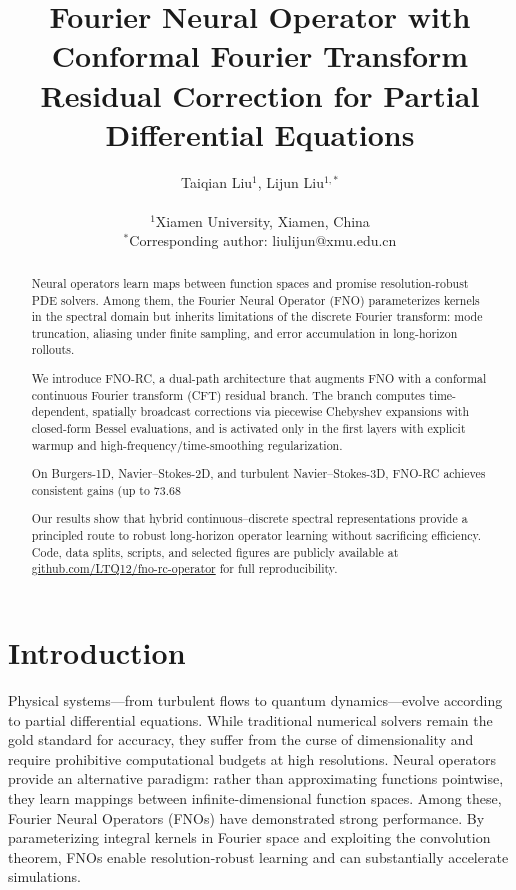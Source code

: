 \documentclass[11pt]{article}
\title{\textbf{Fourier Neural Operator with Conformal Fourier Transform Residual Correction for Partial Differential Equations}}
\author{
    Taiqian Liu$^{1}$, Lijun Liu$^{1,*}$ \\
    \\
    $^{1}$Xiamen University, Xiamen, China \\
    $^{*}$Corresponding author: liulijun@xmu.edu.cn
}
\date{}
\begin{document}
\maketitle

\begin{abstract}
Neural operators learn maps between function spaces and promise resolution-robust PDE solvers. Among them, the Fourier Neural Operator (FNO) parameterizes kernels in the spectral domain but inherits limitations of the discrete Fourier transform: mode truncation, aliasing under finite sampling, and error accumulation in long-horizon rollouts.

We introduce FNO-RC, a dual-path architecture that augments FNO with a conformal continuous Fourier transform (CFT) residual branch. The branch computes time-dependent, spatially broadcast corrections via piecewise Chebyshev expansions with closed-form Bessel evaluations, and is activated only in the first layers with explicit warmup and high-frequency/time-smoothing regularization.

On Burgers-1D, Navier–Stokes-2D, and turbulent Navier–Stokes-3D, FNO-RC achieves consistent gains (up to 73.68%

Our results show that hybrid continuous–discrete spectral representations provide a principled route to robust long-horizon operator learning without sacrificing efficiency. Code, data splits, scripts, and selected figures are publicly available at \href{https://github.com/LTQ12/fno-rc-operator}{github.com/LTQ12/fno-rc-operator} for full reproducibility.
\end{abstract}

\section{Introduction}

Physical systems—from turbulent flows to quantum dynamics—evolve according to partial differential equations. While traditional numerical solvers remain the gold standard for accuracy, they suffer from the curse of dimensionality and require prohibitive computational budgets at high resolutions. Neural operators \citep{kovachki2021neural,lu2021learning} provide an alternative paradigm: rather than approximating functions pointwise, they learn mappings between infinite-dimensional function spaces. Among these, Fourier Neural Operators (FNOs) \citep{Li2020FNO} have demonstrated strong performance. By parameterizing integral kernels in Fourier space and exploiting the convolution theorem, FNOs enable resolution-robust learning and can substantially accelerate simulations.
\end{document}
